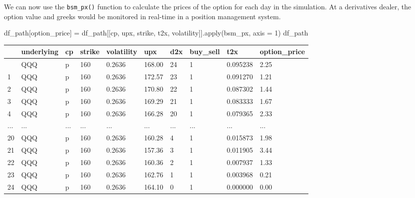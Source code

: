\documentclass[
  letterpaper,
  DIV=11,
  numbers=noendperiod]{scrreprt}
\newenvironment{Shaded}{\begin{snugshade}}{\end{snugshade}}
\newcommand{\BuiltInTok}[1]{\textcolor[rgb]{0.00,0.23,0.31}{#1}}
\newcommand{\DecValTok}[1]{\textcolor[rgb]{0.68,0.00,0.00}{#1}}
\newcommand{\NormalTok}[1]{\textcolor[rgb]{0.00,0.23,0.31}{#1}}
\newcommand{\OperatorTok}[1]{\textcolor[rgb]{0.37,0.37,0.37}{#1}}
\newcommand{\StringTok}[1]{\textcolor[rgb]{0.13,0.47,0.30}{#1}}
\begin{document}
We can now use the \texttt{bsm\_px()} function to calculate the prices
of the option for each day in the simulation. At a derivatives dealer,
the option value and greeks would be monitored in real-time in a
position management system.

\begin{Shaded}
\begin{Highlighting}[]
\NormalTok{df\_path[}\StringTok{\textquotesingle{}option\_price\textquotesingle{}}\NormalTok{] }\OperatorTok{=}\NormalTok{ df\_path[[}\StringTok{\textquotesingle{}cp\textquotesingle{}}\NormalTok{, }\StringTok{\textquotesingle{}upx\textquotesingle{}}\NormalTok{, }\StringTok{\textquotesingle{}strike\textquotesingle{}}\NormalTok{, }\StringTok{\textquotesingle{}t2x\textquotesingle{}}\NormalTok{, }\StringTok{\textquotesingle{}volatility\textquotesingle{}}\NormalTok{]].}\BuiltInTok{apply}\NormalTok{(bsm\_px, axis }\OperatorTok{=} \DecValTok{1}\NormalTok{)}
\NormalTok{df\_path}
\end{Highlighting}
\end{Shaded}

\begin{longtable}[]{@{}llllllllll@{}}
\toprule\noalign{}
& underlying & cp & strike & volatility & upx & d2x & buy\_sell & t2x &
option\_price \\
\midrule\noalign{}
\endhead
\bottomrule\noalign{}
\endlastfoot
0 & QQQ & p & 160 & 0.2636 & 168.00 & 24 & 1 & 0.095238 & 2.25 \\
1 & QQQ & p & 160 & 0.2636 & 172.57 & 23 & 1 & 0.091270 & 1.21 \\
2 & QQQ & p & 160 & 0.2636 & 170.80 & 22 & 1 & 0.087302 & 1.44 \\
3 & QQQ & p & 160 & 0.2636 & 169.29 & 21 & 1 & 0.083333 & 1.67 \\
4 & QQQ & p & 160 & 0.2636 & 166.28 & 20 & 1 & 0.079365 & 2.33 \\
... & ... & ... & ... & ... & ... & ... & ... & ... & ... \\
20 & QQQ & p & 160 & 0.2636 & 160.28 & 4 & 1 & 0.015873 & 1.98 \\
21 & QQQ & p & 160 & 0.2636 & 157.36 & 3 & 1 & 0.011905 & 3.44 \\
22 & QQQ & p & 160 & 0.2636 & 160.36 & 2 & 1 & 0.007937 & 1.33 \\
23 & QQQ & p & 160 & 0.2636 & 162.76 & 1 & 1 & 0.003968 & 0.21 \\
24 & QQQ & p & 160 & 0.2636 & 164.10 & 0 & 1 & 0.000000 & 0.00 \\
\end{longtable}
\end{document}
